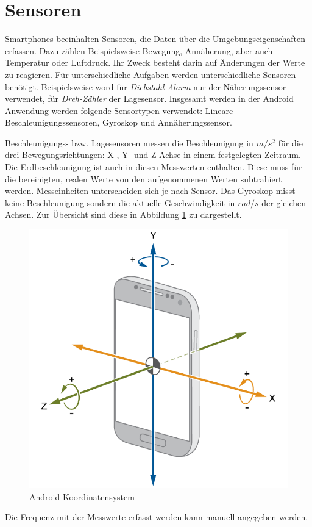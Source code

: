 \documentclass[11pt,a4paper]{report}
\begin{document}
\section{Sensoren}
Smartphones beeinhalten Sensoren, die Daten über die Umgebungseigenschaften erfassen.
Dazu zählen Beispielsweise Bewegung, Annäherung, aber auch Temperatur oder Luftdruck.
Ihr Zweck besteht darin auf Änderungen der Werte zu reagieren.
Für unterschiedliche Aufgaben werden unterschiedliche Sensoren benötigt.
Beispielsweise word für \textit{Diebstahl-Alarm} nur der Näherungssensor verwendet, für \textit{Dreh-Zähler} der Lagesensor.
Insgesamt werden in der Android Anwendung werden folgende Sensortypen verwendet: Lineare Beschleunigungssensoren, Gyroskop und Annäherungssensor.

Beschleunigungs- bzw. Lagesensoren messen die Beschleunigung in $m/s^2$ für die drei Bewegungsrichtungen: X-, Y- und Z-Achse in einem festgelegten Zeitraum.
Die Erdbeschleunigung ist auch in diesen Messwerten enthalten.
Diese muss für die bereinigten, realen Werte von den aufgenommenen Werten subtrahiert werden\cite{accel_g}.
Messeinheiten unterscheiden sich je nach Sensor.
Das Gyroskop misst keine Beschleunigung sondern die aktuelle Geschwindigkeit in $rad/s$ der gleichen Achsen.
Zur Übersicht sind diese in Abbildung \ref{fig:and_axes} zu dargestellt.
\begin{figure}[htbp]
  \centering
  \includegraphics[width=.7\textwidth]{images/android_axes.png}
  \caption{Android-Koordinatensystem}
  \label{fig:and_axes}
\end{figure}
Die Frequenz mit der Messwerte erfasst werden kann manuell angegeben werden.
\end{document}
